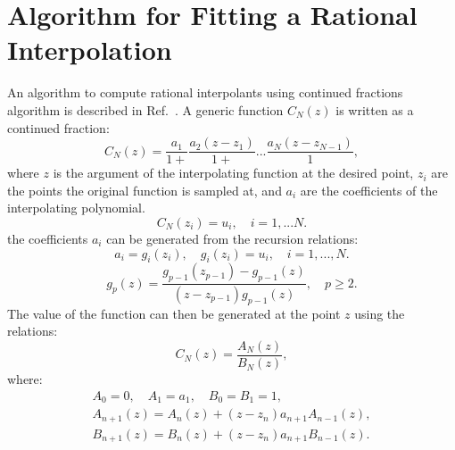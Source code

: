 \section{Algorithm for Fitting a Rational Interpolation}
\label{app:ratint}
An algorithm to compute rational interpolants 
using continued fractions algorithm is described in Ref.~\cite{vidbergserene77}.
A generic function $C_N(z)$ is written as a continued fraction:
%
\begin{equation}
C_{N}(z) = \frac{a_{1}}{1+}\frac{a_{2}(z-z_{1})}{1+}...\frac{a_{N}(z-z_{N-1})}{1},
\end{equation}
%
where $z$ is the argument of the interpolating function
at the desired point, $z_{i}$ are the points the original function is sampled at,
and $a_{i}$ are the coefficients of the interpolating polynomial.
%
\begin{equation}
C_{N}(z_{i}) = u_{i}, \quad i=1,...N.
\end{equation}
%
the coefficients $a_{i}$ can be generated from the recursion relations:
%
\begin{equation}
a_{i} = g_{i}(z_{i}),\quad g_{i}(z_{i})=u_{i},\quad i=1,...,N.
\end{equation}
%
\begin{equation}
g_{p}(z) = \frac{g_{p-1}(z_{p-1}) - g_{p-1}(z)}{(z - z_{p-1})g_{p-1}(z)}, \quad p \geq 2.
\end{equation}
%
The value of the function can then be generated at the point $z$ using the relations:
%
\begin{equation}
C_{N}(z) = \frac{A_{N}(z)}{B_{N}(z)},
\end{equation}
%
where:
%
\begin{eqnarray}
A_{0}=0, \quad A_{1} = a_{1}, \quad B_{0}=B_{1}=1, \nonumber \\
A_{n+1}(z) = A_{n}(z) + (z-z_{n})a_{n+1}A_{n-1}(z), \nonumber \\
B_{n+1}(z) = B_{n}(z) + (z-z_{n})a_{n+1}B_{n-1}(z).
\end{eqnarray}

